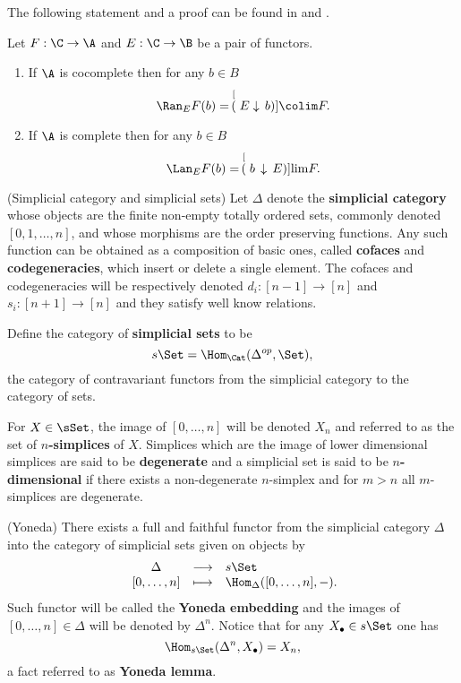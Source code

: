 \documentclass[main.tex]{subfiles}
\begin{document}
The following statement and a proof can be found in \cite[p.237]{MaL98} and \cite[p.244]{MaL98}.

\begin{alemma}\label{formula for Kan extensions}
Let $F:\C\to\A$ and $E:\C\to\B$ be a pair of functors.
\begin{enumerate}[1.]
\item If $\A$ is cocomplete then for any $b\in B$
$$\Ran_E F(b)=\,\stackrel[(E\downarrow\, b)]{}{\colim}F.$$
\item If $\A$ is complete then for any $b\in B$
$$\Lan_E F(b)=\,\stackrel[(b\,\downarrow\, E)]{}{\lim}F.$$
\end{enumerate}
\end{alemma}

\begin{adefn}(Simplicial category and simplicial sets) \label{Simplicial category and simplicial sets}
Let $\Delta$ denote the \textbf{simplicial category} whose objects are the finite non-empty totally ordered sets, commonly denoted $[0, 1, \dotsc, n]$, and whose morphisms are the order preserving functions. Any such function can be obtained as a composition of basic ones, called \textbf{cofaces} and \textbf{codegeneracies}, which insert or delete a single element. The cofaces and codegeneracies will be respectively denoted $d_i:[n-1]\to[n]$ and $s_i:[n+1]\to[n]$ and they satisfy well know relations.

Define the category of \textbf{simplicial sets} to be
$$s\Set=\Hom_{\Cat}(\Delta^{op},\Set),$$
the category of contravariant functors from the simplicial category to the category of sets.

For $X\in\sSet$, the image of $[0,\dotsc,n]$ will be denoted $X_n$ and referred to as the set of \textbf{$n$-simplices} of $X$. Simplices which are the image of lower dimensional simplices are said to be \textbf{degenerate} and a simplicial set is said to be \textbf{$n$-dimensional} if there exists a non-degenerate $n$-simplex and for $m>n$ all $m$-simplices are degenerate.
\end{adefn}

\begin{aremark}(Yoneda)\label{Yoneda}
There exists a full and faithful functor from the simplicial category $\Delta$ into the category of simplicial sets given on objects by $$\begin{array}{ccl}
\ \Delta &\longrightarrow & s\Set \\
\ [0,\dotsc,n] &\longmapsto & \Hom_{\Delta}([0,\dotsc,n],-).
\end{array}$$
Such functor will be called the \textbf{Yoneda embedding} and the images of $[0,\dotsc,n]\in\Delta$ will be denoted by $\Delta^n$. Notice that for any $X_\bullet\in s\Set$ one has $$\Hom_{s\Set}(\Delta^n,X_\bullet)=X_n,$$
a fact referred to as \textbf{Yoneda lemma}.
\end{aremark}
\end{document}
